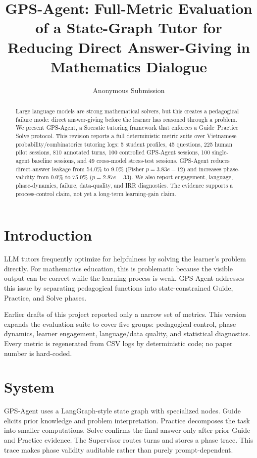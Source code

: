\documentclass[11pt]{article}
\title{GPS-Agent: Full-Metric Evaluation of a State-Graph Tutor for Reducing Direct Answer-Giving in Mathematics Dialogue}
\author{Anonymous Submission}
\begin{document}
\maketitle
\begin{abstract}
Large language models are strong mathematical solvers, but this creates a pedagogical failure mode: direct answer-giving before the learner has reasoned through a problem. We present GPS-Agent, a Socratic tutoring framework that enforces a Guide--Practice--Solve protocol. This revision reports a full deterministic metric suite over Vietnamese probability/combinatorics tutoring logs: 5 student profiles, 45 questions, 225 human pilot sessions, 810 annotated turns, 100 controlled GPS-Agent sessions, 100 single-agent baseline sessions, and 49 cross-model stress-test sessions. GPS-Agent reduces direct-answer leakage from 54.0\% to 9.0\% (Fisher $p=3.83e-12$) and increases phase-validity from 0.0\% to 75.0\% ($p=2.87e-33$). We also report engagement, language, phase-dynamics, failure, data-quality, and IRR diagnostics. The evidence supports a process-control claim, not yet a long-term learning-gain claim.
\end{abstract}

\section{Introduction}
LLM tutors frequently optimize for helpfulness by solving the learner's problem directly. For mathematics education, this is problematic because the visible output can be correct while the learning process is weak. GPS-Agent addresses this issue by separating pedagogical functions into state-constrained Guide, Practice, and Solve phases.

Earlier drafts of this project reported only a narrow set of metrics. This version expands the evaluation suite to cover five groups: pedagogical control, phase dynamics, learner engagement, language/data quality, and statistical diagnostics. Every metric is regenerated from CSV logs by deterministic code; no paper number is hard-coded.

\section{System}
GPS-Agent uses a LangGraph-style state graph with specialized nodes. Guide elicits prior knowledge and problem interpretation. Practice decomposes the task into smaller computations. Solve confirms the final answer only after prior Guide and Practice evidence. The Supervisor routes turns and stores a phase trace. This trace makes phase validity auditable rather than purely prompt-dependent.
\end{document}
